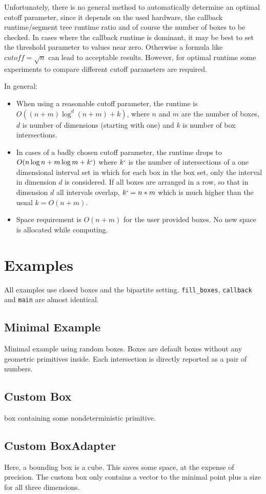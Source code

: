 Unfortunately, there is no general method to automatically determine an optimal cutoff parameter, since it depends on the used hardware, the callback runtime/segment tree runtime ratio and of course the number of boxes to be checked. In cases where the callback runtime is dominant, it may be best to set the threshold parameter to values near zero. Otherwise a formula like $cutoff=\sqrt{n}$ can lead to acceptable results. However, for optimal runtime some experiments to compare different cutoff parameters are required.

In general:
\begin{itemize}
  \item When using a reasonable cutoff parameter, the runtime is $O((n+m)\log^{d}(n+m)+k)$, where $n$ and $m$ are the number of boxes, $d$ is number of dimensions (starting with one) and $k$ is number of box intersections.
  \item In cases of a badly chosen cutoff parameter, the runtime drops to $O(n\log n+m\log m+k`)$ where $k`$ is the number of intersections of a one dimensional interval set in which for each box in the box set, only the interval in dimension $d$ is considered. If all boxes are arranged in a row, so that in dimension $d$ all intervals overlap, $k`=n*m$ which is much higher than the usual $k=O(n+m)$.
  \item Space requirement is $O(n+m)$ for the user provided boxes. No new space is allocated while computing.
\end{itemize}

\section*{Examples}
All examples use closed boxes and the bipartite setting. \texttt{fill\_boxes}, \texttt{callback} and \texttt{main} are almost identical.
\subsection*{Minimal Example}
Minimal example using random boxes. Boxes are default boxes without any geometric primitives inside. Each intersection is directly reported as a pair of numbers.

\subsection*{Custom Box}
box containing some nondeterministic primitive.

\subsection*{Custom BoxAdapter }
Here, a bounding box is a cube. This saves some space, at the expense of precision. The custom box only contains a vector to the minimal point plus a size for all three dimensions.



